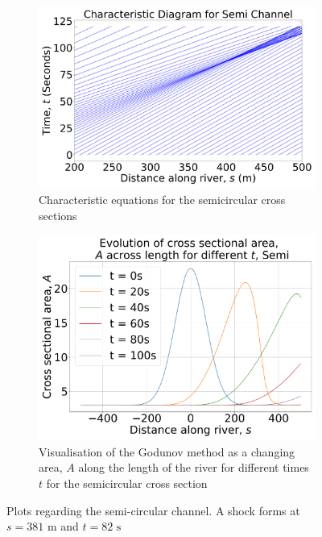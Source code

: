 \documentclass[12pt]{article}
\begin{document}
\begin{figure}[h]
    \centering
    \begin{subfigure}[b]{0.49\textwidth}
        \centering
        \includegraphics[width=\textwidth]{Figures/Semi_characteristic.pdf}
        \caption{Characteristic equations for the semicircular cross sections}
        \label{fig:semi_char}
    \end{subfigure}
    \hfill
    \begin{subfigure}[b]{0.49\textwidth}
        \centering
        \includegraphics[width=\textwidth]{Figures/Semi_godunov.pdf}
        \caption{Visualisation of the Godunov method as a changing area, $A$ along the length of the river for different times $t$ for the semicircular cross section}
        \label{fig:semi_godunov}
    \end{subfigure}
    \caption{Plots regarding the semi-circular channel. A shock forms at $s= 381\text{ m}$ and $t= 82\text{ s}$}
\end{figure}
\end{document}
